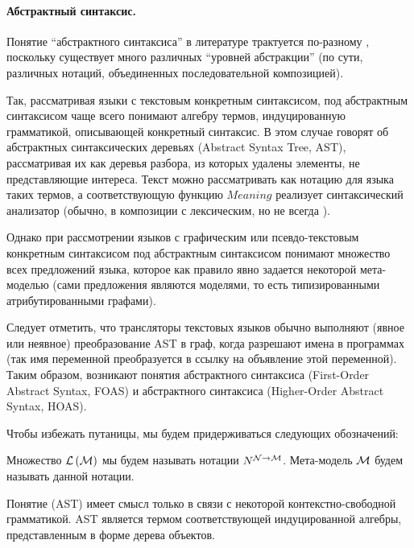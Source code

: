\paragraph*{Абстрактный синтаксис. } Понятие ``абстрактного синтаксиса'' в литературе трактуется по-разному \cite{Dragon ...}, поскольку существует много различных ``уровней абстракции'' (по сути, различных нотаций, объединенных последовательной композицией).

Так, рассматривая языки с текстовым конкретным синтаксисом, под абстрактным синтаксисом чаще всего понимают алгебру термов, индуцированную грамматикой, описывающей конкретный синтаксис. В этом случае говорят об абстрактных синтаксических деревьях (Abstract Syntax Tree, AST), рассматривая их как деревья разбора, из которых удалены элементы, не представляющие интереса. Текст можно рассматривать как нотацию для языка таких термов, а соответствующую функцию $Meaning$ реализует синтаксический анализатор (обычно, в композиции с лексическим, но не всегда \cite{SGLR}).

Однако при рассмотрении языков с графическим или псевдо-текстовым конкретным синтаксисом  \cite{MPS, ...} под абстрактным синтаксисом понимают множество всех предложений языка, которое как правило явно задается некоторой мета-моделью (сами предложения являются моделями, то есть типизированными атрибутированными графами).

Следует отметить, что трансляторы текстовых языков обычно выполняют (явное или неявное) преобразование AST в граф, когда разрешают имена в программах (так имя переменной преобразуется в ссылку на объявление этой переменной). Таким образом, возникают понятия  абстрактного синтаксиса (First-Order Abstract Syntax, FOAS) и абстрактного синтаксиса  (Higher-Order Abstract Syntax, HOAS). 

Чтобы избежать путаницы, мы будем придерживаться следующих обозначений:

\begin{Def}
Множество $\mathcal{L}\left(\mathcal{M}\right)$ мы будем называть  нотации $N^{{\mathcal{N}} \rightarrow{} {\mathcal{M}}}$. Мета-модель $\mathcal{M}$ будем называть  данной нотации.
\end{Def}

\begin{Def}
Понятие  (AST) имеет смысл только в связи с некоторой контекстно-свободной грамматикой. AST является термом соответствующей индуцированной алгебры, представленным в форме дерева объектов.
\end{Def}

